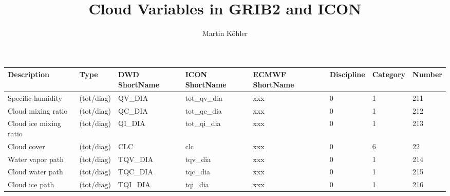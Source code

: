 \documentclass[11pt,notitlepage]{article}
\title{Cloud Variables in GRIB2 and ICON}
\author{Martin K\"ohler}
\begin{document}
  
\maketitle


\hspace{-2cm}
\begin{centering}
\begin{tabular}{l l p{2.5cm} p{2.5cm} p{2.5cm} l l l}  

\textbf{Description}   & \textbf{Type}          
                       & \textbf{DWD \linebreak ShortName} 
                       & \textbf{ICON \linebreak ShortName} 
                       & \textbf{ECMWF \linebreak ShortName} 
                       & \textbf{Discipline} & \textbf{Category} & \textbf{Number} \\
\hline                                                                                    
Specific humidity      &  (tot/diag)   &  QV\_DIA               &  tot\_qv\_dia           &  xxx                     &  0                  &     1             &        211 \\
Cloud mixing ratio     &  (tot/diag)   &  QC\_DIA               &  tot\_qc\_dia           &  xxx                     &  0                  &     1             &        212 \\
Cloud ice mixing ratio &  (tot/diag)   &  QI\_DIA               &  tot\_qi\_dia           &  xxx                     &  0                  &     1             &        213 \\
Cloud cover            &  (tot/diag)   &  CLC                   &  clc                    &  xxx                     &  0                  &     6             &        22  \\
Water vapor path       &  (tot/diag)   &  TQV\_DIA              &  tqv\_dia               &  xxx                     &  0                  &     1             &        214 \\
Cloud water path       &  (tot/diag)   &  TQC\_DIA              &  tqc\_dia               &  xxx                     &  0                  &     1             &        215 \\
Cloud ice path         &  (tot/diag)   &  TQI\_DIA              &  tqi\_dia               &  xxx                     &  0                  &     1             &        216 \\

\end{tabular}
\end{centering}
\end{document}
